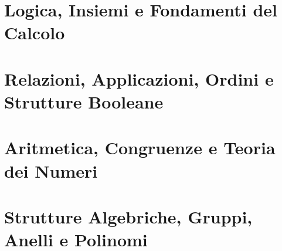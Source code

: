 \documentclass[11pt,a4paper,twoside,openright]{book}
\begin{document}
\frontmatter



\tableofcontents

\mainmatter

\part{Logica, Insiemi e Fondamenti del Calcolo}



\part{Relazioni, Applicazioni, Ordini e Strutture Booleane}



\part{Aritmetica, Congruenze e Teoria dei Numeri}


\part{Strutture Algebriche, Gruppi, Anelli e Polinomi}


\end{document}
